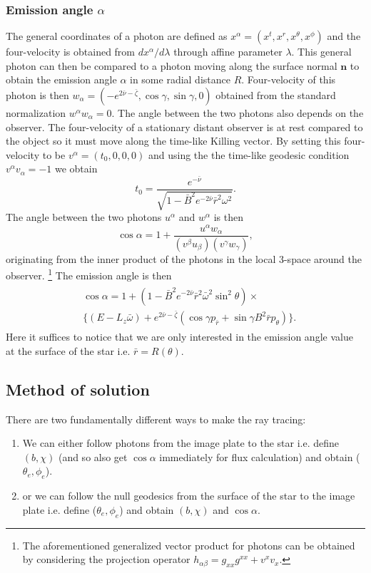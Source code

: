 \documentclass[iop, usenatbib]{emulateapj}
\newcommand{\be}{\begin{equation}}
\newcommand{\ee}{\end{equation}}
\renewcommand{\vec}[1]{\ensuremath{\boldsymbol{#1}}​}
\newcommand{\Ca}{\ensuremath{\mathcal{C}}}
\newcommand{\rb}{\ensuremath{\bar{r}}}
\newcommand{\wb}{\ensuremath{\bar{\omega}}}
\newcommand{\nub}{\ensuremath{\bar{\nu}}}
\newcommand{\zetab}{\ensuremath{\bar{\zeta}}}
\newcommand{\Bb}{\ensuremath{\bar{B}}}
\begin{document}
\subsubsection{Emission angle $\alpha$}
The general coordinates of a photon are defined as $x^{\alpha} = (x^{t}, x^{r}, x^{\theta}, x^{\phi})$ and the four-velocity is obtained from $dx^{\alpha}/d\lambda$ through affine parameter $\lambda$.
This general photon can then be compared to a photon moving along the surface normal $\vec{n}$ to obtain the emission angle $\alpha$ in some radial distance $R$.
Four-velocity of this photon is then $w_{\alpha} = (-e^{2\nub-\zetab}, \cos\gamma, \sin\gamma, 0 )$ obtained from the standard normalization $w^{\alpha}w_{\alpha} = 0$.
The angle between the two photons also depends on the observer.
The four-velocity of a stationary distant observer is at rest compared to the object so it must move along the time-like Killing vector.
By setting this four-velocity to be $v^{\alpha}=(t_0,0,0,0)$ and using the the time-like geodesic condition $v^{\alpha} v_{\alpha} = -1$ we obtain 
\be
t_0 = \frac{e^{-\nub}}{\sqrt{1 - \Bb^2 e^{-2\nub} \rb^2 \omega^2}}.
\ee
The angle between the two photons $u^{\alpha}$ and $w^{\alpha}$ is then \citep{PFC83}
\be
\cos \alpha = 1 + \frac{u^{\alpha}w_{\alpha}}{(v^{\beta} u_{\beta})(v^{\gamma} w_{\gamma})},
\ee
originating from the inner product of the photons in the local 3-space around the observer.%
\footnote{
The aforementioned generalized vector product for photons can be obtained by considering the projection operator $h_{\alpha \beta} = g_{xx}g^{xx} + v^xv_x$.
}
The emission angle is then
\begin{align}\begin{split}
&\cos \alpha = 1 + (1-\Bb^2 e^{-2\nub} \rb^2\wb^2\sin^2\theta) \times \\
&\{ (E-L_z \wb) + e^{2\nub-\zetab} (\cos\gamma p_{\rb} + \sin\gamma B^2 \rb p_{\theta}) \}.
\end{split}\end{align}
Here it suffices to notice that we are only interested in the emission angle value at the surface of the star i.e. $\rb = R(\theta)$.

\subsection{Method of solution}
There are two fundamentally different ways to make the ray tracing:
\begin{enumerate}
\item We can either follow photons from the image plate to the star i.e. define $(b,\chi)$ (and so also get $\cos\alpha$ immediately for flux calculation) and obtain ($\theta_e,\phi_e$).
\item or we can follow the null geodesics from the surface of the star to the image plate i.e. define ($\theta_e,\phi_e$) and obtain $(b, \chi)$ and $\cos\alpha$.
\end{enumerate}
\end{document}

